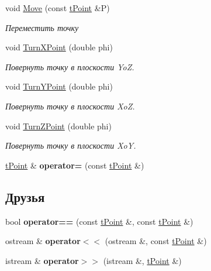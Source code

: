 \begin{DoxyCompactItemize}
\mbox{\label{classtPoint_ab85d062451a895276bcd60bdba888768}} 
void \hyperlink{classtPoint_ab85d062451a895276bcd60bdba888768}{Move} (const \hyperlink{classtPoint}{t\+Point} \&P)
\begin{DoxyCompactList}\small\item\em Переместить точку \end{DoxyCompactList}\item 
\mbox{\label{classtPoint_a13e8f123791c52d15a9fc631ac47a7fe}} 
void \hyperlink{classtPoint_a13e8f123791c52d15a9fc631ac47a7fe}{Turn\+X\+Point} (double phi)
\begin{DoxyCompactList}\small\item\em Повернуть точку в плоскости YoZ. \end{DoxyCompactList}\item 
\mbox{\label{classtPoint_a7509d78eadd35f4e48da991927bab368}} 
void \hyperlink{classtPoint_a7509d78eadd35f4e48da991927bab368}{Turn\+Y\+Point} (double phi)
\begin{DoxyCompactList}\small\item\em Повернуть точку в плоскости XoZ. \end{DoxyCompactList}\item 
\mbox{\label{classtPoint_aea130545fd9a4a137901c483d2b9570f}} 
void \hyperlink{classtPoint_aea130545fd9a4a137901c483d2b9570f}{Turn\+Z\+Point} (double phi)
\begin{DoxyCompactList}\small\item\em Повернуть точку в плоскости XoY. \end{DoxyCompactList}\item 
\mbox{\label{classtPoint_a01916af640294762c1946f10c03b06ec}} 
\hyperlink{classtPoint}{t\+Point} \& {\bfseries operator=} (const \hyperlink{classtPoint}{t\+Point} \&)
\end{DoxyCompactItemize}
\subsection*{Друзья}
\begin{DoxyCompactItemize}
\item 
\mbox{\label{classtPoint_a596f2f80bfe55efa7074306033e5656c}} 
bool {\bfseries operator==} (const \hyperlink{classtPoint}{t\+Point} \&, const \hyperlink{classtPoint}{t\+Point} \&)
\item 
\mbox{\label{classtPoint_aca0717ecb2dfcd55c8b0a6eb56c6c16b}} 
ostream \& {\bfseries operator$<$$<$} (ostream \&, const \hyperlink{classtPoint}{t\+Point} \&)
\item 
\mbox{\label{classtPoint_a21e934e5bfe986e0b39885970a361047}} 
istream \& {\bfseries operator$>$$>$} (istream \&, \hyperlink{classtPoint}{t\+Point} \&)
\end{DoxyCompactItemize}


